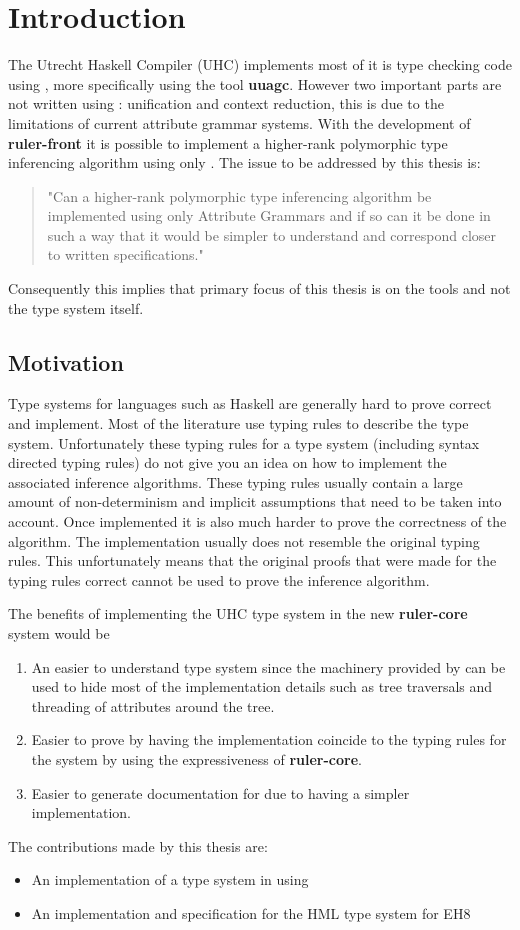 \chapter{Introduction}
The Utrecht Haskell Compiler (UHC\cite{UHC}) implements most of it is type checking code using \ag, more specifically using the tool \textbf{uuagc}\cite{uuagc}. However two important parts are not written using \ag: unification and context reduction, this is due to the limitations of current attribute grammar systems. With the development of \textbf{ruler-front}\cite{ruler-front} it is possible to implement a higher-rank polymorphic type inferencing algorithm using only \ag. The issue to be addressed by this thesis is:

\begin{quotation}
"Can a higher-rank polymorphic type inferencing algorithm be implemented using only Attribute Grammars and if so can it be done in such a way that it would be simpler to understand and correspond closer to written specifications."
\end{quotation}

Consequently this implies that primary focus of this thesis is on the tools and not the type system itself.

\section{Motivation}
Type systems for languages such as Haskell are generally hard to prove correct and implement. Most of the literature use typing rules to describe the type system. Unfortunately these typing rules for a type system (including syntax directed typing rules) do not give you an idea on how to implement the associated inference algorithms. These typing rules usually contain a large amount of non-determinism and implicit assumptions that need to be taken into account.
Once implemented it is also much harder to prove the correctness of the algorithm. The implementation usually does not resemble the original typing rules. This unfortunately means that the original proofs that were made for the typing rules correct cannot be used to prove the inference algorithm.

The benefits of implementing the UHC type system in the new \textbf{ruler-core} system would be

\begin{enumerate}
\item An easier to understand type system since the machinery provided by \ags can be used to hide most of the implementation details such as tree traversals and threading of attributes around the tree.
\item Easier to prove by having the implementation coincide to the typing rules for the system by using the expressiveness of \textbf{ruler-core}.
\item Easier to generate documentation for due to having a simpler implementation.
\end{enumerate}

The contributions made by this thesis are:
\begin{itemize}
\item An implementation of a type system in \ags using \rcore
\item An implementation and specification for the HML type system for EH8
\end{itemize}
